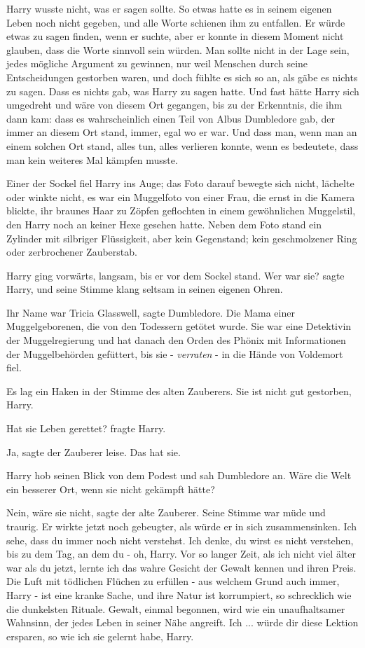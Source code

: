 Harry wusste nicht, was er sagen sollte. So etwas hatte es in seinem eigenen
Leben noch nicht gegeben, und alle Worte schienen ihm zu entfallen. Er würde
etwas zu sagen finden, wenn er suchte, aber er konnte in diesem Moment nicht
glauben, dass die Worte sinnvoll sein würden. Man sollte nicht in der Lage sein,
jedes mögliche Argument zu gewinnen, nur weil Menschen durch seine
Entscheidungen gestorben waren, und doch fühlte es sich so an, als gäbe es
nichts zu sagen. Dass es nichts gab, was Harry zu sagen hatte. Und fast hätte
Harry sich umgedreht und wäre von diesem Ort gegangen, bis zu der Erkenntnis,
die ihm dann kam: dass es wahrscheinlich einen Teil von Albus Dumbledore gab,
der immer an diesem Ort stand, immer, egal wo er war. Und dass man, wenn man an
einem solchen Ort stand, alles tun, alles verlieren konnte, wenn es bedeutete,
dass man kein weiteres Mal kämpfen musste.

Einer der Sockel fiel Harry ins Auge; das Foto darauf bewegte sich nicht,
lächelte oder winkte nicht, es war ein Muggelfoto von einer Frau, die ernst in
die Kamera blickte, ihr braunes Haar zu Zöpfen geflochten in einem gewöhnlichen
Muggelstil, den Harry noch an keiner Hexe gesehen hatte. Neben dem Foto stand
ein Zylinder mit silbriger Flüssigkeit, aber kein Gegenstand; kein geschmolzener
Ring oder zerbrochener Zauberstab.

Harry ging vorwärts, langsam, bis er vor dem Sockel stand. \glqq{}Wer war
sie?\grqq{} sagte Harry, und seine Stimme klang seltsam in seinen eigenen Ohren.

\glqq{}Ihr Name war Tricia Glasswell\grqq{}, sagte Dumbledore. \glqq{}Die Mama
einer Muggelgeborenen, die von den Todessern getötet wurde. Sie war eine
Detektivin der Muggelregierung und hat danach den Orden des Phönix mit
Informationen der Muggelbehörden gefüttert, bis sie - \emph{verraten} - in die
Hände von Voldemort fiel.\grqq{}

Es lag ein Haken in der Stimme des alten Zauberers. \glqq{}Sie ist nicht gut
gestorben, Harry.\grqq{}

\glqq{}Hat sie Leben gerettet?\grqq{} fragte Harry.

\glqq{}Ja\grqq{}, sagte der Zauberer leise. \glqq{}Das hat sie.\grqq{}

Harry hob seinen Blick von dem Podest und sah Dumbledore an. \glqq{}Wäre die Welt
ein besserer Ort, wenn sie nicht gekämpft hätte?\grqq{}

\glqq{}Nein, wäre sie nicht\grqq{}, sagte der alte Zauberer. Seine Stimme war
müde und traurig. Er wirkte jetzt noch gebeugter, als würde er in sich
zusammensinken. \glqq{}Ich sehe, dass du immer noch nicht verstehst. Ich denke,
du wirst es nicht verstehen, bis zu dem Tag, an dem du - oh, Harry. Vor so
langer Zeit, als ich nicht viel älter war als du jetzt, lernte ich das wahre
Gesicht der Gewalt kennen und ihren Preis. Die Luft mit tödlichen Flüchen zu
erfüllen - aus welchem Grund auch immer, Harry - ist eine kranke Sache, und ihre
Natur ist korrumpiert, so schrecklich wie die dunkelsten Rituale. Gewalt, einmal
begonnen, wird wie ein unaufhaltsamer Wahnsinn, der jedes Leben in seiner Nähe
angreift. Ich ... würde dir diese Lektion ersparen, so wie ich sie gelernt habe,
Harry.\grqq{}

